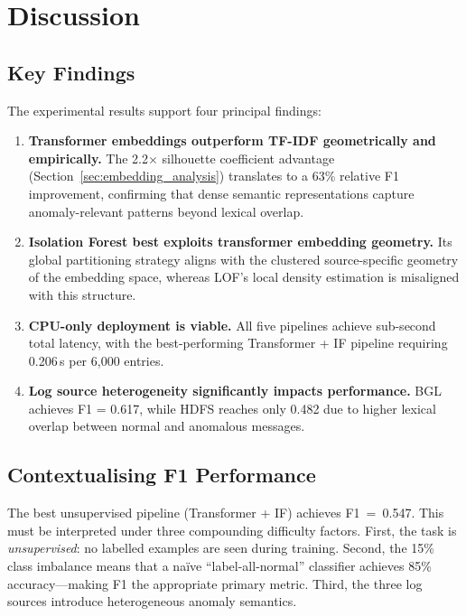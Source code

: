 \documentclass[conference]{IEEEtran}
\begin{document}
\section{Discussion}
\label{sec:discussion}

\subsection{Key Findings}

The experimental results support four principal findings:

\begin{enumerate}
    \item \textbf{Transformer embeddings outperform TF-IDF geometrically and
          empirically.}  The 2.2$\times$ silhouette coefficient advantage
          (Section~\ref{sec:embedding_analysis}) translates to a 63\%
          relative F1 improvement, confirming that dense semantic
          representations capture anomaly-relevant patterns beyond lexical
          overlap.
    \item \textbf{Isolation Forest best exploits transformer embedding
          geometry.}  Its global partitioning strategy aligns with the
          clustered source-specific geometry of the embedding space, whereas
          LOF's local density estimation is misaligned with this structure.
    \item \textbf{CPU-only deployment is viable.}  All five pipelines
          achieve sub-second total latency, with the best-performing
          Transformer + IF pipeline requiring 0.206\,s per 6{,}000 entries.
    \item \textbf{Log source heterogeneity significantly impacts performance.}
          BGL achieves F1 = 0.617, while HDFS reaches only 0.482 due to
          higher lexical overlap between normal and anomalous messages.
\end{enumerate}

\subsection{Contextualising F1 Performance}

The best unsupervised pipeline (Transformer + IF) achieves F1~=~0.547.
This must be interpreted under three compounding difficulty factors.  First,
the task is \emph{unsupervised}: no labelled examples are seen during
training.  Second, the 15\% class imbalance means that a na\"{i}ve
``label-all-normal'' classifier achieves 85\% accuracy---making F1 the
appropriate primary metric.  Third, the three log sources introduce
heterogeneous anomaly semantics.
\end{document}
